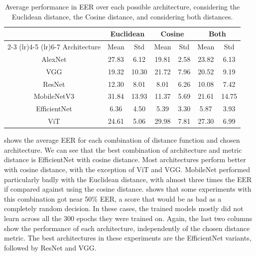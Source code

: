 \begin{table}[t!]
    \centering
    \caption{Average performance in \gls{EER} over each possible architecture, considering the Euclidean distance, the Cosine distance, and considering both distances.}
    \label{tab:architecture_agg}
    \setlength{\tabcolsep}{4pt}
    \begin{tabular}{ccc|cc|cc}
        & \multicolumn{2}{c}{Euclidean} & \multicolumn{2}{c}{Cosine} & \multicolumn{2}{c}{Both} \\
        \cmidrule(lr){2-3} \cmidrule(lr){4-5} \cmidrule(lr){6-7}
        Architecture & Mean & Std & Mean & Std & Mean & Std \\
        \midrule
        AlexNet         & 27.83 & 6.12 & 19.81 & 2.58 & 23.82 & 6.13 \\
        VGG             & 19.32 & 10.30 & 21.72 & 7.96 & 20.52 & 9.19 \\
        ResNet          & 12.30 & 8.01 & 8.01 & 6.26 & 10.08 & 7.42 \\
        MobileNetV3     & 31.84 & 13.93 & 11.37 & 5.69 & 21.61 & 14.75 \\
        EfficientNet    & 6.36 & 4.50 & 5.39 & 3.30 & 5.87 & 3.93 \\
        ViT             & 24.61 & 5.06 & 29.98 & 7.81 & 27.30 & 6.99 \\
        \bottomrule
    \end{tabular}
\end{table}

 shows the average \gls{EER} for each combination of distance function and chosen architecture. We can see that the best combination of architecture and metric distance is EfficientNet with cosine distance. Most architectures perform better with cosine distance, with the exception of \gls{ViT} and VGG. MobileNet performed particularly badly with the Euclidean distance, with almost three times the \gls{EER} if compared against using the cosine distance.  shows that some experiments with this combination got near 50\% \gls{EER}, a score that would be as bad as a completely random decision. In these cases, the trained models mostly did not learn across all the 300 epochs they were trained on. Again, the last two columns show the performance of each architecture, independently of the chosen distance metric. The best architectures in these experiments are the EfficientNet variants, followed by ResNet and VGG.

